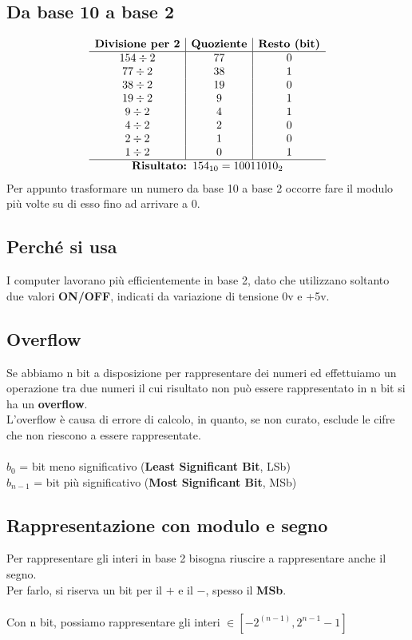 \documentclass[12pt]{article}
\begin{document}
\subsection{Da base 10 a base 2}
\[
\begin{array}{c|c|c}
\textbf{Divisione per 2} & \textbf{Quoziente} & \textbf{Resto (bit)} \\ \hline
154 \div 2 & 77  & 0 \\
77 \div 2  & 38  & 1 \\
38 \div 2  & 19  & 0 \\
19 \div 2  & 9   & 1 \\
9 \div 2   & 4   & 1 \\
4 \div 2   & 2   & 0 \\
2 \div 2   & 1   & 0 \\
1 \div 2   & 0   & 1 \\ \hline
\multicolumn{3}{c}{\textbf{Risultato: } 154_{10} = 10011010_2}
\end{array}
\]
Per appunto trasformare un numero da base 10 a base 2 occorre fare il modulo più volte su di esso fino ad arrivare a 0.\\

\subsection{Perché si usa}
I computer lavorano più efficientemente in base 2, dato che utilizzano soltanto due valori \textbf{ON/OFF}, indicati da variazione
di tensione 0v e +5v.\\

\subsection{Overflow}
Se abbiamo n bit a disposizione per rappresentare dei numeri ed effettuiamo un operazione tra due numeri il cui risultato non può essere rappresentato in n bit si ha un \textbf{overflow}.\\
L'overflow è causa di errore di calcolo, in quanto, se non curato, esclude le cifre che non riescono a essere rappresentate.\\\\
\textbf{$b_0$} = bit meno significativo (\textbf{Least Significant Bit}, LSb)\\
\textbf{$b_{n-1}$} = bit più significativo (\textbf{Most Significant Bit}, MSb)

\subsection{Rappresentazione con modulo e segno}
Per rappresentare gli interi in base 2 bisogna riuscire a rappresentare anche il segno.\\
Per farlo, si riserva un bit per il $+$ e il $-$, spesso il \textbf{MSb}.\\\\
Con n bit, possiamo rappresentare gli interi $\in [-2^{(n-1)},2^{n-1}-1]$
\end{document}
